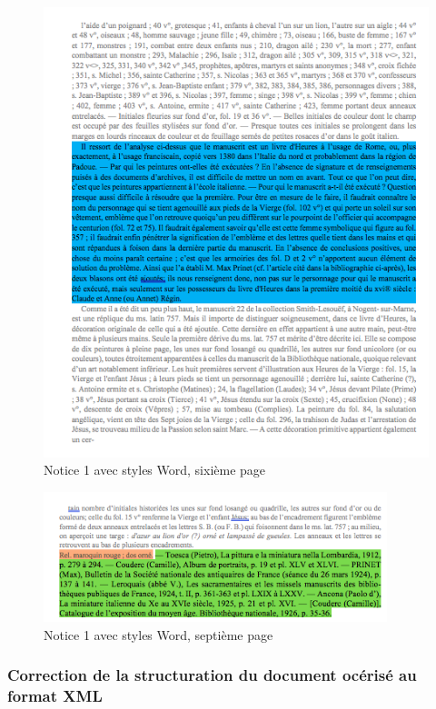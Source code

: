 \documentclass[a4paper,12pt,twoside]{book}
\begin{document}
    \begin{figure}[!h]
    \centering
    \includegraphics[width=15cm]{img/Doc_Sources_transformation/Docs_Word_Styles/Notice1/StylesNotice1_6.png}
    \caption{Notice 1 avec styles Word, sixième page}
    \end{figure}
    \clearpage
    
    \begin{figure}[!h]
    \centering
    \includegraphics[width=10cm]{img/Doc_Sources_transformation/Docs_Word_Styles/Notice1/StylesNotice1_7.png}
    \caption{Notice 1 avec styles Word, septième page}
    \end{figure}
    
    
    \subsubsection{\label{correction_doc_ocerise}Correction de la structuration du document océrisé au format XML}
    
\end{document}
